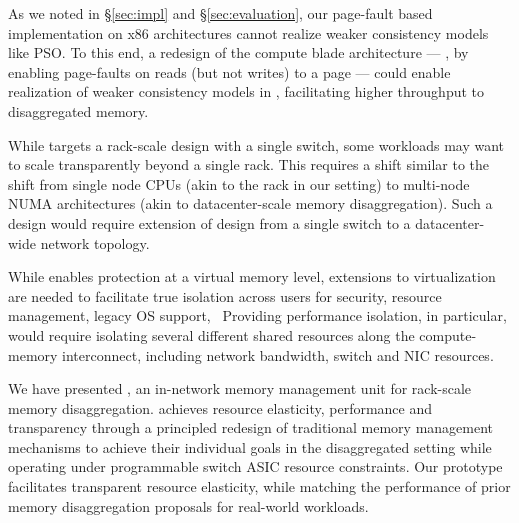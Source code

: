  As we noted in \S\ref{sec:impl} and \S\ref{sec:evaluation}, our page-fault based implementation on x86 architectures cannot realize weaker consistency models like PSO. To this end, a redesign of the compute blade architecture --- \eg, by enabling page-faults on reads (but not writes) to a page --- could enable realization of weaker consistency models in \mind, facilitating higher throughput to disaggregated memory.

 While \mind targets a rack-scale design with a single switch, some workloads may want to scale transparently beyond a single rack. This requires a shift similar to the shift from single node CPUs (akin to the rack in our setting) to multi-node NUMA architectures (akin to datacenter-scale memory disaggregation). Such a design would require extension of \mind design from a single switch to a datacenter-wide network topology.

 While \mind enables protection at a virtual memory level, extensions to virtualization are needed to facilitate true isolation across users for security, resource management, legacy OS support, \etc~Providing performance isolation, in particular, would require isolating several different shared resources along the compute-memory interconnect, including network bandwidth, switch and NIC resources.


We have presented \mind, an in-network memory management unit for rack-scale memory disaggregation. \mind achieves resource elasticity, performance and transparency through a principled redesign of traditional memory management mechanisms to achieve their individual goals in the disaggregated setting while operating under programmable switch ASIC resource constraints. Our \mind prototype facilitates transparent resource elasticity, while matching the performance of prior memory disaggregation proposals for real-world workloads.


